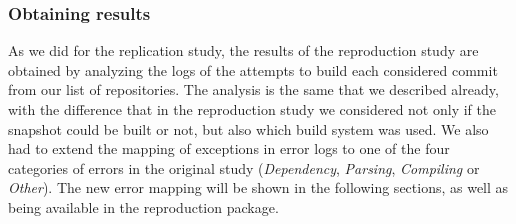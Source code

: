 \subsubsection{Obtaining results}

As we did for the replication study, the results of the reproduction study are obtained by analyzing the logs of the attempts to build each considered commit from our list of repositories. The analysis is the same that we described already, with the difference that in the reproduction study we considered not only if the snapshot could be built or not, but also which build system was used. We also had to extend the mapping of exceptions in error logs to one of the four categories of errors in the original study (\textit{Dependency}, \textit{Parsing}, \textit{Compiling} or \textit{Other}). 
The new error mapping will be shown in the following sections, as well as being available in the reproduction package.
